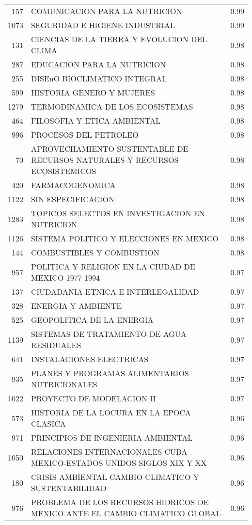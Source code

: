 \begin{table}[ht]
\begin{tabular}{rlr}
  157 & COMUNICACION PARA LA NUTRICION & 0.99 \\ 
  1073 & SEGURIDAD E HIGIENE INDUSTRIAL & 0.99 \\ 
  131 & CIENCIAS DE LA TIERRA Y EVOLUCION DEL CLIMA & 0.98 \\ 
  287 & EDUCACION PARA LA NUTRICION & 0.98 \\ 
  255 & DISEnO BIOCLIMATICO INTEGRAL & 0.98 \\ 
  599 & HISTORIA GENERO Y MUJERES & 0.98 \\ 
  1279 & TERMODINAMICA DE LOS ECOSISTEMAS & 0.98 \\ 
  464 & FILOSOFIA Y ETICA AMBIENTAL & 0.98 \\ 
  996 & PROCESOS DEL PETROLEO & 0.98 \\ 
  70 & APROVECHAMIENTO SUSTENTABLE DE RECURSOS NATURALES Y RECURSOS ECOSISTEMICOS & 0.98 \\ 
  420 & FARMACOGENOMICA & 0.98 \\ 
  1122 & SIN ESPECIFICACION & 0.98 \\ 
  1283 & TOPICOS SELECTOS EN INVESTIGACION EN NUTRICION & 0.98 \\ 
  1126 & SISTEMA POLITICO Y ELECCIONES EN MEXICO & 0.98 \\ 
  144 & COMBUSTIBLES Y COMBUSTION & 0.98 \\ 
  957 & POLITICA Y RELIGION EN LA CIUDAD DE MEXICO 1977-1994 & 0.97 \\ 
  137 & CIUDADANIA ETNICA E INTERLEGALIDAD & 0.97 \\ 
  328 & ENERGIA Y AMBIENTE & 0.97 \\ 
  525 & GEOPOLITICA DE LA ENERGIA & 0.97 \\ 
  1139 & SISTEMAS DE TRATAMIENTO DE AGUA RESIDUALES & 0.97 \\ 
  641 & INSTALACIONES ELECTRICAS & 0.97 \\ 
  935 & PLANES Y PROGRAMAS ALIMENTARIOS NUTRICIONALES & 0.97 \\ 
  1022 & PROYECTO DE MODELACION II & 0.97 \\ 
  573 & HISTORIA DE LA LOCURA EN LA EPOCA CLASICA & 0.96 \\ 
  971 & PRINCIPIOS DE INGENIERIA AMBIENTAL & 0.96 \\ 
  1050 & RELACIONES INTERNACIONALES CUBA-MEXICO-ESTADOS UNIDOS SIGLOS XIX Y XX & 0.96 \\ 
  180 & CRISIS AMBIENTAL CAMBIO CLIMATICO Y SUSTENTABILIDAD & 0.96 \\ 
  976 & PROBLEMA DE LOS RECURSOS HIDRICOS DE MEXICO ANTE EL CAMBIO CLIMATICO GLOBAL & 0.96 \\ 

\end{tabular}
\end{table}
